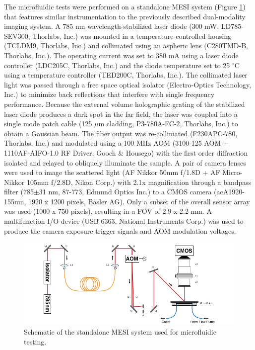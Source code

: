 The microfluidic tests were performed on a standalone MESI system (Figure \ref{fig:standaloneschematic}) that features similar instrumentation to the previously described dual-modality imaging system. A 785 nm wavelength-stabilized laser diode (300 mW, LD785-SEV300, Thorlabs, Inc.) was mounted in a temperature-controlled housing (TCLDM9, Thorlabs, Inc.) and collimated using an aspheric lens (C280TMD-B, Thorlabs, Inc.). The operating current was set to 380 mA using a laser diode controller (LDC205C, Thorlabs, Inc.) and the diode temperature set to 25 $^\circ$C using a temperature controller (TED200C, Thorlabs, Inc.). The collimated laser light was passed through a free space optical isolator (Electro-Optics Technology, Inc.) to minimize back reflections that interfere with single frequency performance. Because the external volume holographic grating of the stabilized laser diode produces a dark spot in the far field, the laser was coupled into a single mode patch cable (125 $\mu$m cladding, P3-780A-FC-2, Thorlabs, Inc.) to obtain a Gaussian beam. The fiber output was re-collimated (F230APC-780, Thorlabs, Inc.) and modulated using a 100 MHz AOM (3100-125 AOM + 1110AF-AIFO-1.0 RF Driver, Gooch \& Housego) with the first order diffraction isolated and relayed to obliquely illuminate the sample. A pair of camera lenses were used to image the scattered light (AF Nikkor 50mm f/1.8D + AF Micro-Nikkor 105mm f/2.8D, Nikon Corp.) with 2.1x magnification through a bandpass filter (785$\pm$31 nm, 87-773, Edmund Optics Inc.) to a CMOS camera (acA1920-155um, 1920 x 1200 pixels, Basler AG). Only a subset of the overall sensor array was used (1000 x 750 pixels), resulting in a FOV of 2.9 x 2.2 mm. A multifunction I/O device (USB-6363, National Instruments Corp.) was used to produce the camera exposure trigger signals and AOM modulation voltages.

\begin{figure}
    \includegraphics{figures/chapter_4/standaloneschematic.pdf}
    \caption{
        \label{fig:standaloneschematic}
        Schematic of the standalone MESI system used for microfluidic testing.
    }
\end{figure}

